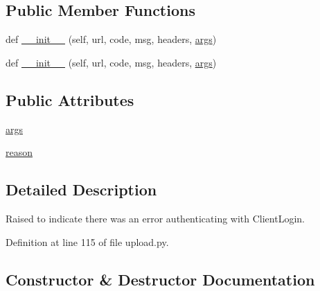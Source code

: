 \subsection*{Public Member Functions}
\begin{DoxyCompactItemize}
\item 
def \hyperlink{classupload_1_1ClientLoginError_a1e590616c2976d881e155958cedbbe47}{\+\_\+\+\_\+init\+\_\+\+\_\+} (self, url, code, msg, headers, \hyperlink{classupload_1_1ClientLoginError_ac300a0b034b2bc64cedc51e09fb6d663}{args})
\item 
def \hyperlink{classupload_1_1ClientLoginError_a1e590616c2976d881e155958cedbbe47}{\+\_\+\+\_\+init\+\_\+\+\_\+} (self, url, code, msg, headers, \hyperlink{classupload_1_1ClientLoginError_ac300a0b034b2bc64cedc51e09fb6d663}{args})
\end{DoxyCompactItemize}
\subsection*{Public Attributes}
\begin{DoxyCompactItemize}
\item 
\hyperlink{classupload_1_1ClientLoginError_ac300a0b034b2bc64cedc51e09fb6d663}{args}
\item 
\hyperlink{classupload_1_1ClientLoginError_ae0555feb182d89d1e4d7944afbfe14e5}{reason}
\end{DoxyCompactItemize}


\subsection{Detailed Description}
\begin{DoxyVerb}Raised to indicate there was an error authenticating with ClientLogin.\end{DoxyVerb}
 

Definition at line 115 of file upload.\+py.



\subsection{Constructor \& Destructor Documentation}
\mbox{\label{classupload_1_1ClientLoginError_a1e590616c2976d881e155958cedbbe47}} 
